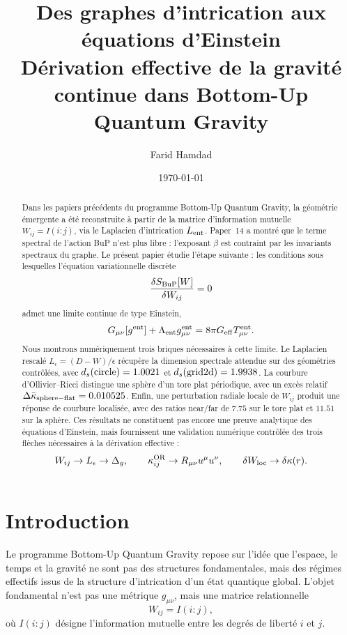 \documentclass[11pt,a4paper]{article}
\title{
\textbf{Des graphes d'intrication aux équations d'Einstein}\\
\large Dérivation effective de la gravité continue dans Bottom-Up Quantum Gravity
}
\author{Farid Hamdad}
\date{\today}
\begin{document}
\maketitle

\begin{abstract}
Dans les papiers précédents du programme Bottom-Up Quantum Gravity, la
géométrie émergente a été reconstruite à partir de la matrice d'information
mutuelle \(W_{ij}=I(i:j)\), via le Laplacien d'intrication \(L_{\rm ent}\).
Paper~14 a montré que le terme spectral de l'action BuP n'est plus libre :
l'exposant \(\beta\) est contraint par les invariants spectraux du graphe.
Le présent papier étudie l'étape suivante : les conditions sous lesquelles
l'équation variationnelle discrète
\[
\frac{\delta S_{\rm BuP}[W]}{\delta W_{ij}}=0
\]
admet une limite continue de type Einstein,
\[
G_{\mu\nu}[g^{\rm ent}]
+
\Lambda_{\rm ent}g_{\mu\nu}^{\rm ent}
=
8\pi G_{\rm eff}T_{\mu\nu}^{\rm ent}.
\]
Nous montrons numériquement trois briques nécessaires à cette limite. Le
Laplacien rescalé \(L_\epsilon=(D-W)/\epsilon\) récupère la dimension
spectrale attendue sur des géométries contrôlées, avec
\(d_s({\rm circle})=1.0021\) et \(d_s({\rm grid2d})=1.9938\). La courbure
d'Ollivier--Ricci distingue une sphère d'un tore plat périodique, avec un
excès relatif \(\Delta\bar\kappa_{\rm sphere-flat}=0.010525\). Enfin, une
perturbation radiale locale de \(W_{ij}\) produit une réponse de courbure
localisée, avec des ratios near/far de \(7.75\) sur le tore plat et \(11.51\)
sur la sphère. Ces résultats ne constituent pas encore une preuve analytique
des équations d'Einstein, mais fournissent une validation numérique contrôlée
des trois flèches nécessaires à la dérivation effective :
\[
W_{ij}\to L_\epsilon\to\Delta_g,
\qquad
\kappa_{ij}^{\rm OR}\to R_{\mu\nu}u^\mu u^\nu,
\qquad
\delta W_{\rm loc}\to\delta\kappa(r).
\]
\end{abstract}

\tableofcontents

\section{Introduction}

Le programme Bottom-Up Quantum Gravity repose sur l'idée que l'espace, le
temps et la gravité ne sont pas des structures fondamentales, mais des
régimes effectifs issus de la structure d'intrication d'un état quantique
global. L'objet fondamental n'est pas une métrique \(g_{\mu\nu}\), mais une
matrice relationnelle
\[
W_{ij}=I(i:j),
\]
où \(I(i:j)\) désigne l'information mutuelle entre les degrés de liberté
\(i\) et \(j\).
\end{document}

